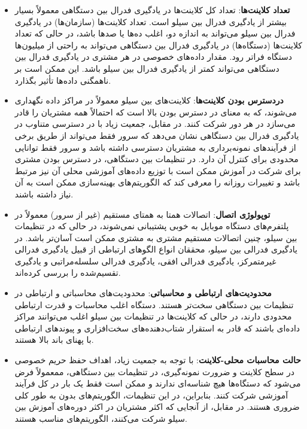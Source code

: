 \begin{itemize}
	\item 
	\textbf{تعداد کلاینت‌ها}: تعداد کل کلاینت‌ها در یادگیری فدرال بین دستگاهی معمولاً بسیار بیشتر از یادگیری فدرال بین سیلو است. تعداد کلاینت‌ها (سازمان‌ها) در یادگیری فدرال بین سیلو می‌تواند به اندازه دو، اغلب ده‌ها یا صدها باشد، در حالی که تعداد کلاینت‌ها‌ (دستگاه‌ها) در یادگیری فدرال بین دستگاهی می‌تواند به راحتی از میلیون‌ها دستگاه فراتر رود. مقدار داده‌های خصوصی در هر مشتری در یادگیری فدرال بین دستگاهی می‌تواند کمتر از یادگیری فدرال بین سیلو باشد. این ممکن است بر ناهمگنی داده‌ها تأثیر بگذارد.
	\item 
	\textbf{دردسترس بودن کلاینت‌ها}: کلاینت‌های بین سیلو معمولاً در مراکز داده نگهداری می‌شوند، که به معنای در دسترس بودن بالا است که احتمالاً همه مشتریان را قادر می‌سازد در هر دور شرکت کنند. در مقابل، جمعیت زیاد با در دسترسی متناوب در یادگیری فدرال بین دستگاهی نشان می‌دهد که سرور فقط می‌تواند از طریق برخی از فرآیندهای نمونه‌برداری به مشتریان دسترسی داشته باشد و سرور فقط توانایی محدودی برای کنترل آن دارد. در تنظیمات بین دستگاهی، در دسترس بودن مشتری برای شرکت در آموزش ممکن است با توزیع داده‌های آموزشی محلی آن نیز مرتبط باشد و تغییرات روزانه را معرفی کند که الگوریتم‌های بهینه‌سازی ممکن است به آن نیاز داشته باشند.
	\item 
	\textbf{توپولوژی اتصال}: اتصالات همتا به همتای مستقیم (غیر از سرور) معمولاً در پلتفرم‌های دستگاه موبایل به خوبی پشتیبانی نمی‌شوند، در حالی که در تنظیمات بین سیلو، چنین اتصالات مستقیم مشتری به مشتری ممکن است آسان‌تر باشد. در یادگیری فدرالی بین سیلو، محققان انواع الگوهای ارتباطی از قبیل یادگیری فدرالی غیرمتمرکز، یادگیری فدرالی افقی، یادگیری فدرالی سلسله‌مراتبی و یادگیری تقسیم‌شده را بررسی کرده‌اند.
	\item
	\textbf{محدودیت‌های ارتباطی و محاسباتی}: محدودیت‌های محاسباتی و ارتباطی در تنظیمات بین دستگاهی سخت‌تر هستند. دستگاه اغلب محاسبات و قدرت ارتباطی محدودی دارند، در حالی که کلاینت‌ها در تنظیمات بین سیلو اغلب می‌توانند مراکز داده‌ای باشند که قادر به استقرار شتاب‌دهنده‌های سخت‌افزاری و پیوندهای ارتباطی با پهنای باند بالا هستند.
	\item 
	\textbf{حالت محاسبات محلی-کلاینت}: با توجه به جمعیت زیاد، اهداف حفظ حریم خصوصی در سطح کلاینت و ضرورت نمونه‌گیری، در تنظیمات بین دستگاهی، ممعمولاً فرض می‌شود که دستگاه‌ها هیچ شناسه‌ای ندارند و ممکن است فقط یک بار در کل فرآیند آموزشی شرکت کنند. بنابراین، در این تنظیمات، الگوریتم‌های بدون  به طور کلی ضروری هستند. در مقابل، از آنجایی که اکثر مشتریان در اکثر دوره‌های آموزش بین سیلو شرکت می‌کنند، الگوریتم‌های  مناسب هستند.
\end{itemize}

